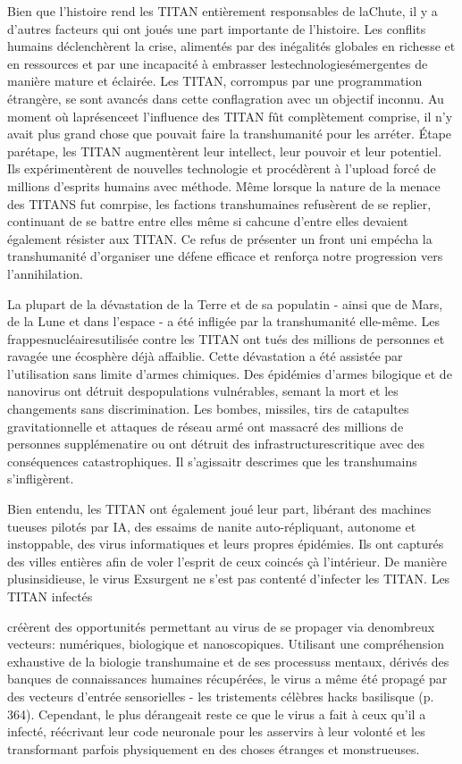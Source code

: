 Bien que l'histoire rend les TITAN entièrement responsables de laChute, il y a d'autres facteurs qui ont joués une part importante de l'histoire. Les conflits humains déclenchèrent la crise, alimentés par des inégalités globales en richesse et en ressources et par une incapacité à embrasser lestechnologiesémergentes de manière mature et éclairée. Les TITAN, corrompus par une programmation étrangère, se sont avancés dans cette conflagration avec un objectif inconnu. Au moment où laprésenceet l'influence des TITAN fût complètement comprise, il n'y avait plus grand chose que pouvait faire la transhumanité pour les arréter. Étape parétape, les TITAN augmentèrent leur intellect, leur pouvoir et leur potentiel. Ils expérimentèrent de nouvelles technologie et procédèrent à l'upload forcé de millions d'esprits humains avec méthode. Même lorsque la nature de la menace des TITANS fut comrpise, les factions transhumaines refusèrent de se replier, continuant de se battre entre elles même si cahcune d'entre elles devaient également résister aux TITAN. Ce refus de présenter un front uni empécha la transhumanité d'organiser une défene efficace et renforça notre progression vers l'annihilation. 

La plupart de la dévastation de la Terre et de sa populatin - ainsi que de Mars, de la Lune et dans l'espace - a été infligée par la transhumanité elle-même. Les frappesnucléairesutilisée contre les TITAN ont tués des millions de personnes et ravagée une écosphère déjà affaiblie. Cette dévastation a été assistée par l'utilisation sans limite d'armes chimiques. Des épidémies d'armes bilogique et de nanovirus ont détruit despopulations vulnérables, semant la mort et les changements sans discrimination. Les bombes, missiles, tirs de catapultes gravitationnelle et attaques de réseau armé ont massacré des millions de personnes supplémenatire ou ont détruit des infrastructurescritique avec des conséquences catastrophiques. Il s'agissaitr descrimes que les transhumains s'infligèrent. 

Bien entendu, les TITAN ont également joué leur part, libérant des machines tueuses pilotés par IA, des essaims de nanite auto-répliquant, autonome et instoppable, des virus informatiques et leurs propres épidémies. Ils ont capturés des villes entières afin de voler l'esprit de ceux coincés çà l'intérieur. De manière plusinsidieuse, le virus Exsurgent ne s'est pas contenté d'infecter les TITAN. Les TITAN infectés 

créèrent des opportunités permettant au virus de se propager via denombreux vecteurs: numériques, biologique et nanoscopiques. Utilisant une compréhension exhaustive de la biologie transhumaine et de ses processuss mentaux, dérivés des banques de connaissances humaines récupérées, le virus a même été propagé par des vecteurs d'entrée sensorielles - les tristements célèbres hacks basilisque (p. 364). Cependant, le plus dérangeait reste ce que le virus a fait à ceux qu'il a infecté, réécrivant leur code neuronale pour les asservirs à leur volonté et les transformant parfois physiquement en des choses étranges et monstrueuses. 

